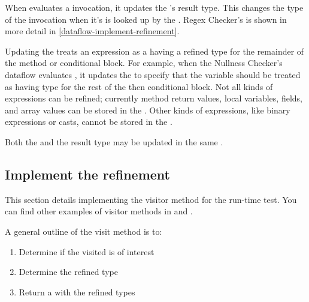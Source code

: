 When  evaluates a
 invocation, it updates the
's result type. This changes the
type of the  invocation when it's
 is looked up by the
.  Regex Checker's
 is shown in more detail in
\ref{dataflow-implement-refinement}.

Updating the  treats an expression as a
having a refined type for the remainder of the method or conditional block. For
example, when the Nullness Checker's dataflow evaluates , it
updates the  to specify that the variable
 should be treated as having type  for the rest of the
then conditional block.  Not all kinds of expressions can be refined; currently
method return values, local variables, fields, and array values can be stored in
the .  Other kinds of expressions, like
binary expressions or casts, cannot be stored in the
.

Both the  and the result type may be updated
in the same .

\subsection{Implement the refinement\label{dataflow-implement-refinement}}

This section details implementing the visitor method
 for the 
run-time test.  You can find other examples of visitor methods in
 and
.

A general outline of the visit method is to:
\begin{enumerate}
\item Determine if the visited  is of interest
\item Determine the refined type
\item Return a  with the refined
    types
\end{enumerate}


